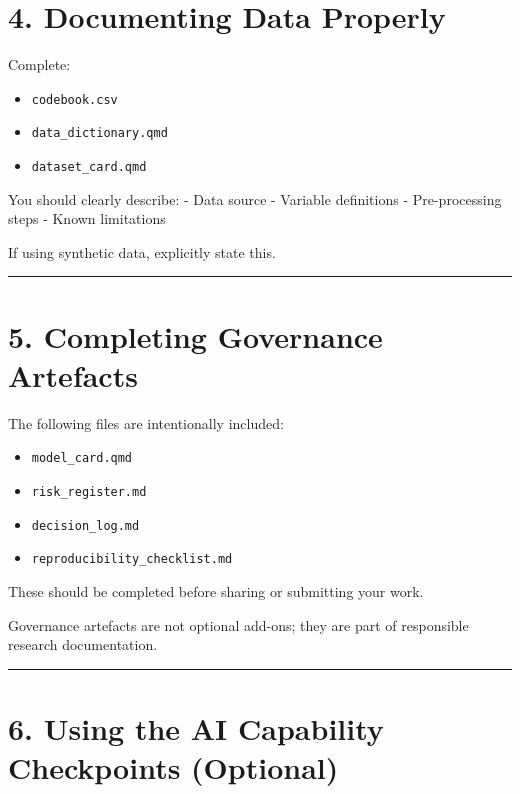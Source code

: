 \documentclass[
]{report}
\providecommand{\tightlist}{%
  \setlength{\itemsep}{0pt}\setlength{\parskip}{0pt}}
\begin{document}
\section{4. Documenting Data Properly}\label{documenting-data-properly}

Complete:

\begin{itemize}
\tightlist
\item
  \texttt{codebook.csv}
\item
  \texttt{data\_dictionary.qmd}
\item
  \texttt{dataset\_card.qmd}
\end{itemize}

You should clearly describe: - Data source - Variable definitions -
Pre-processing steps - Known limitations

If using synthetic data, explicitly state this.

\begin{center}\rule{0.5\linewidth}{0.5pt}\end{center}

\section{5. Completing Governance
Artefacts}\label{completing-governance-artefacts}

The following files are intentionally included:

\begin{itemize}
\tightlist
\item
  \texttt{model\_card.qmd}
\item
  \texttt{risk\_register.md}
\item
  \texttt{decision\_log.md}
\item
  \texttt{reproducibility\_checklist.md}
\end{itemize}

These should be completed before sharing or submitting your work.

Governance artefacts are not optional add-ons; they are part of
responsible research documentation.

\begin{center}\rule{0.5\linewidth}{0.5pt}\end{center}

\section{6. Using the AI Capability Checkpoints
(Optional)}\label{using-the-ai-capability-checkpoints-optional}
\end{document}
